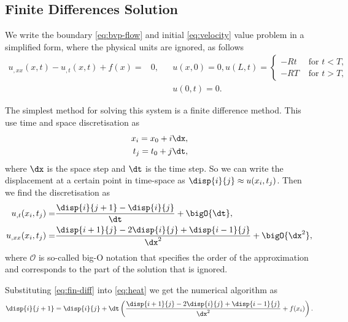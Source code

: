\documentclass[twoside,a4paper,12pt]{article}
\begin{document}
\subsection{Finite Differences Solution}

We write the boundary \eqref{eq:bvp-flow} and initial
\eqref{eq:velocity} value problem in a simplified form, where the
physical units are ignored, as follows
%
\begin{align}
  \label{eq:heat}
  u_{,xx}(x,t) - u_{,t}(x,t) + f(x) 
  =& 0 ,        &&u(x,0) = 0, u(L,t) =
            \begin{cases}
              -Rt &\text{ for } t < T,\\
              -RT &\text{ for } t > T,
            \end{cases}\\\nonumber
 &&& u(0,t) = 0.
\end{align}

The simplest method for solving this system is a finite difference
method. This use time and space discretisation as
%
\begin{subequations}
  \begin{align}
    x_i = x_0 + i\dx,\\
    t_j = t_0 + j\dt,
  \end{align} \label{eq:discr}
\end{subequations}
%
where $\dx$ is the space step and $\dt$ is the time step.  So we can
write the displacement at a certain point in time-space as
$\disp{i}{j} \approx u(x_i,t_j)$. Then we find the discretisation as
%
\begin{subequations}
  \begin{align}
    u_{,t}(x_i,t_j)  =& \frac{\disp{i}{j+1} - \disp{i}{j}}{\dt} + \bigO{\dt}, \\
    u_{,xx}(x_i,t_j) =& \frac{\disp{i+1}{j} - 2\disp{i}{j} + \disp{i-1}{j}}{\dx^2} + \bigO{\dx^2},
  \end{align}\label{eq:fin-diff}
\end{subequations}
%
where $\mathcal{O}$ is so-called big-O notation that specifies the
order of the approximation and corresponds to the part of the solution
that is ignored.

Substituting \eqref{eq:fin-diff} into \eqref{eq:heat} we get the
numerical algorithm as
%
\begin{align}
\disp{i}{j+1}  =   \disp{i}{j} + \dt\left(\frac{\disp{i+1}{j} - 2\disp{i}{j} + \disp{i-1}{j}}{\dx^2}   + f(x_i) \right). \label{eq:findiff-alg}
\end{align}
\end{document}
